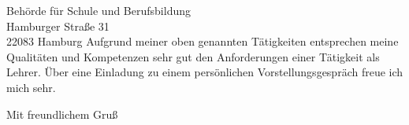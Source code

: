 \documentclass[ebner,paper=a4,fontsize=11pt,ngerman,BCOR=10mm]{scrlttr2}%
\begin{document}
\begin{letter}{ Beh{\"o}rde f{\"u}r Schule und Berufsbildung\\
Hamburger Stra{\ss}e 31\\ 
22083 Hamburg}
Aufgrund meiner oben genannten T{\"a}tigkeiten entsprechen meine Qualit{\"a}ten und
Kompetenzen sehr gut den Anforderungen einer T{\"a}tigkeit als Lehrer. {\"U}ber eine Einladung zu einem pers{\"o}nlichen Vorstellungsgespr{\"a}ch freue ich mich sehr.


\closing{Mit freundlichem Gru\ss}
\enlargethispage{6\baselineskip}

\end{letter}
\end{document}
